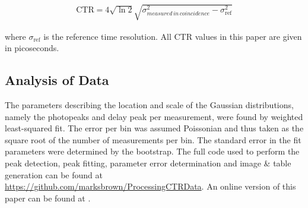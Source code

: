 \begin{align}
\text{CTR} = 4\sqrt{\ln{2}}\sqrt{\sigma_{measured \, in \, coincidence}^2-\sigma_\textrm{ref}^2}
\end{align}

where $\sigma_\text{ref}$ is the reference time resolution. All CTR values in this paper are given in picoseconds.

\subsection{Analysis of Data}
The parameters describing the location and scale of the Gaussian distributions, namely the photopeaks and delay peak per measurement, were found by weighted least-squared fit. The error per bin was assumed Poissonian and thus taken as the square root of the number of measurements per bin. The standard error in the fit parameters were determined by the bootstrap\cite{degroot2012probability}. The full code used to perform the peak detection, peak fitting, parameter error determination and image \& table generation can be found at \href{https://github.com/marksbrown/ProcessingCTRData}{https://github.com/marksbrown/ProcessingCTRData}. An online version of this paper can be found at \cite{Brown2014}.
